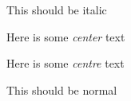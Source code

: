\documentclass{article}
\newenvironment{centre}
{\begin{center}}
{\end{center}}
\newenvironment{my-it}{\it }{}
\begin{document}
\begin{my-it}
	This should be italic
\end{my-it}
%
%
\begin{center}
	Here is some {\it center} text
\end{center}
%
%
\begin{centre}
	Here is some {\it centre} text
\end{centre}
This should be normal
\end{document}
